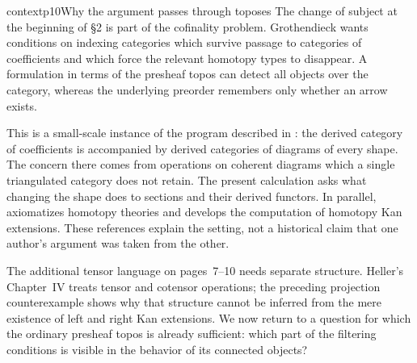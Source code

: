\begin{dcomment}{context}{p10}{Why the argument passes through toposes}
The change of subject at the beginning of \S2 is part of the cofinality problem. Grothendieck wants conditions on indexing categories which survive passage to categories of coefficients and which force the relevant homotopy types to disappear. A formulation in terms of the presheaf topos can detect all objects over the category, whereas the underlying preorder remembers only whether an arrow exists.

This is a small-scale instance of the program described in \citet[\S69, especially the discussion of diagram categories on pp.~1--3 of the excerpt]{Grothendieck1983}: the derived category of coefficients is accompanied by derived categories of diagrams of every shape. The concern there comes from operations on coherent diagrams which a single triangulated category does not retain. The present calculation asks what changing the shape does to sections and their derived functors. In parallel, \citet[Chapter~II, \S1; Chapter~III, \S2]{Heller1988} axiomatizes homotopy theories and develops the computation of homotopy Kan extensions. These references explain the setting, not a historical claim that one author's argument was taken from the other.

The additional tensor language on pages~7--10 needs separate structure. Heller's Chapter~IV treats tensor and cotensor operations; the preceding projection counterexample shows why that structure cannot be inferred from the mere existence of left and right Kan extensions. We now return to a question for which the ordinary presheaf topos is already sufficient: which part of the filtering conditions is visible in the behavior of its connected objects?
\end{dcomment}

